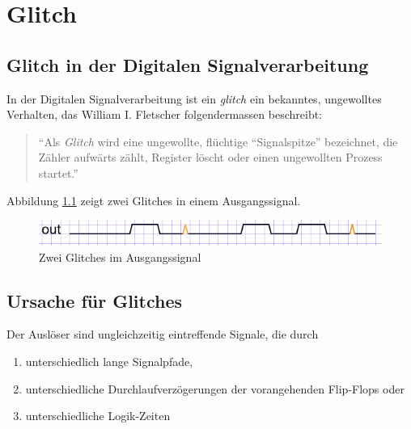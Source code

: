 
\chapter{Glitch}\label{chap.glitch}

\section{Glitch in der Digitalen Signalverarbeitung}\label{sect.glitch_def}
In der Digitalen Signalverarbeitung ist ein \textit{glitch} ein bekanntes, ungewolltes Verhalten, das William I. Fletscher folgendermassen beschreibt:

\begin{quote}
``Als \textit{Glitch}  wird eine ungewollte, flüchtige ``Signalspitze'' bezeichnet, die Zähler aufwärts zählt, Register löscht oder einen ungewollten Prozess startet.''  \citep{F_glitches}
\end{quote}


Abbildung \ref{fig.glitch.def} zeigt zwei Glitches in einem Ausgangssignal.

\begin{figure}[H]
	\includegraphics[width=\textwidth]{images/glitch/def_glitch_1.png}
	\caption{Zwei Glitches im Ausgangssignal}
	\label{fig.glitch.def}
\end{figure}


\section{Ursache für Glitches}\label{sect.glitch_ursache}

Der Auslöser sind ungleichzeitig eintreffende Signale, die durch

\begin{enumerate}
\item unterschiedlich lange Signalpfade,
\item unterschiedliche Durchlaufverzögerungen der vorangehenden Flip-Flops oder
\item unterschiedliche Logik-Zeiten
\end{enumerate}

